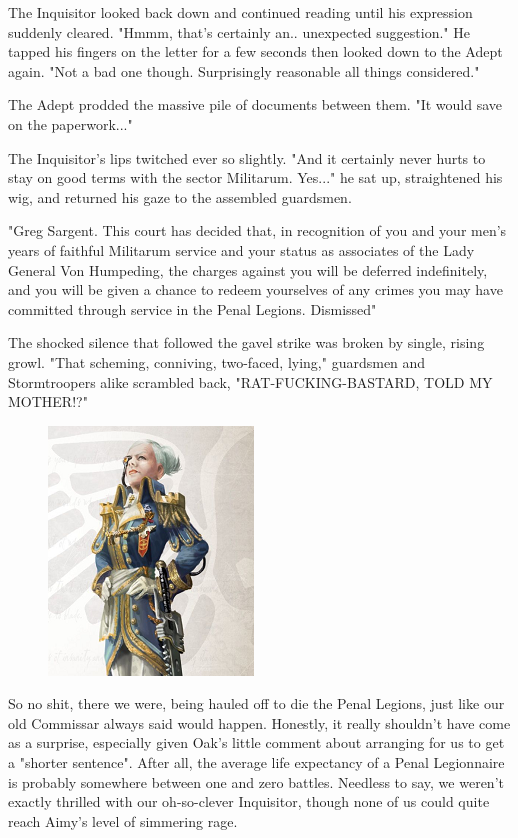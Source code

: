 The Inquisitor looked back down and continued reading until his expression suddenly cleared. 
"Hmmm, that's certainly an.. 
unexpected suggestion." He tapped his fingers on the letter for a few seconds then looked down to the Adept again. 
"Not a bad one though. 
Surprisingly reasonable all things considered." 

The Adept prodded the massive pile of documents between them. 
"It would save on the paperwork..."

The Inquisitor's lips twitched ever so slightly. 
"And it certainly never hurts to stay on good terms with the sector Militarum. 
Yes..." he sat up, straightened his wig, and returned his gaze to the assembled guardsmen.

 "Greg Sargent. 
This court has decided that, in recognition of you and your men's years of faithful Militarum service and your status as associates of the Lady General Von Humpeding, the charges against you will be deferred indefinitely, and you will be given a chance to redeem yourselves of any crimes you may have committed through service in the Penal Legions. 
Dismissed"

The shocked silence that followed the gavel strike was broken by single, rising growl. 
"That scheming, conniving, two-faced, lying," guardsmen and Stormtroopers alike scrambled back, "RAT-FUCKING-BASTARD, TOLD MY MOTHER!?"



\begin{figure}
	\begin{center}
		\includegraphics[width=\figwidth]{pics/21/5.png}
	\end{center}
\end{figure}
So no shit, there we were, being hauled off to die the Penal Legions, just like our old Commissar always said would happen. 
Honestly, it really shouldn't have come as a surprise, especially given Oak's little comment about arranging for us to get a "shorter sentence". 
After all, the average life expectancy of a Penal Legionnaire is probably somewhere between one and zero battles. 
Needless to say, we weren't exactly thrilled with our oh-so-clever Inquisitor, though none of us could quite reach Aimy's level of simmering rage. 


